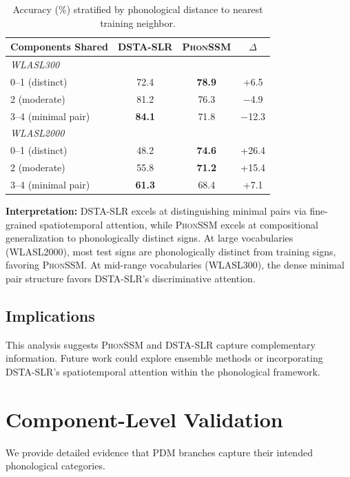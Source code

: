 \documentclass[sigconf,nonacm,anonymous]{acmart}
\theoremstyle{definition}
\theoremstyle{remark}
\newcommand{\phonssm}{\textsc{PhonSSM}}
\begin{document}
\begin{table}[ht]
\caption{Accuracy (\%) stratified by phonological distance to nearest training neighbor.}
\label{tab:method_by_distance}
\begin{center}
\small
\begin{tabular}{lccc}
\toprule
Components Shared & DSTA-SLR & \phonssm{} & $\Delta$ \\
\midrule
\multicolumn{4}{l}{\textit{WLASL300}} \\
0--1 (distinct) & 72.4 & \textbf{78.9} & +6.5 \\
2 (moderate) & 81.2 & 76.3 & $-$4.9 \\
3--4 (minimal pair) & \textbf{84.1} & 71.8 & $-$12.3 \\
\midrule
\multicolumn{4}{l}{\textit{WLASL2000}} \\
0--1 (distinct) & 48.2 & \textbf{74.6} & +26.4 \\
2 (moderate) & 55.8 & \textbf{71.2} & +15.4 \\
3--4 (minimal pair) & \textbf{61.3} & 68.4 & +7.1 \\
\bottomrule
\end{tabular}
\end{center}
\end{table}

\textbf{Interpretation:} DSTA-SLR excels at distinguishing minimal pairs via fine-grained spatiotemporal attention, while \phonssm{} excels at compositional generalization to phonologically distinct signs. At large vocabularies (WLASL2000), most test signs are phonologically distinct from training signs, favoring \phonssm{}. At mid-range vocabularies (WLASL300), the dense minimal pair structure favors DSTA-SLR's discriminative attention.

\subsection{Implications}

This analysis suggests \phonssm{} and DSTA-SLR capture complementary information. Future work could explore ensemble methods or incorporating DSTA-SLR's spatiotemporal attention within the phonological framework.

\section{Component-Level Validation}
\label{app:component_validation}

We provide detailed evidence that PDM branches capture their intended phonological categories.
\end{document}
